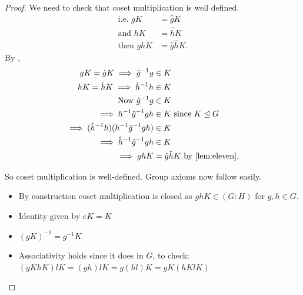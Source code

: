 \begin{proof}
We need to check that coset multiplication is well defined.
\begin{align*}
    \text{i.e. } gK &= \hat{g}K \\
    \text{and } hK &= \hat{h}K \\
    \text{then } ghK &= \hat{g} \hat{h} K.
\end{align*}
By ,
\begin{align*}
    gK = \hat{g} K \implies \hat{g}^{-1} g &\in K \\
    hK = \hat{h} K \implies \hat{h}^{-1} h &\in K \\
    \text{Now } \hat{g}^{-1} g &\in K \\
    \implies h^{-1} \hat{g}^{-1} g h &\in K \text{ since } K \trianglelefteq G \\
    \implies (\hat{h}^{-1} h) (h^{-1} \hat{g}^{-1} g h) &\in K \\
    \implies \hat{h}^{-1}\hat{g}^{-1} g h &\in K \\
    \implies ghK &= \hat{g} \hat{h} K \text{ by \Cref{lem:eleven}.}
\end{align*} 

So coset multiplication is well-defined.
Group axioms now follow easily.

\begin{itemize}
\item
  By construction coset multiplication is closed as \(ghK \in (G : H)\) for \(g, h \in G\).
\item
  Identity given by \(eK = K\)
\item
  \((gK)^{-1} = g^{-1} K\)
\item
  Associativity holds since it does in \(G\), to check:
  \((gK hK) lK = (gh)l K = g(hl)K = gK (hK lK)\).
\end{itemize}

\end{proof}


